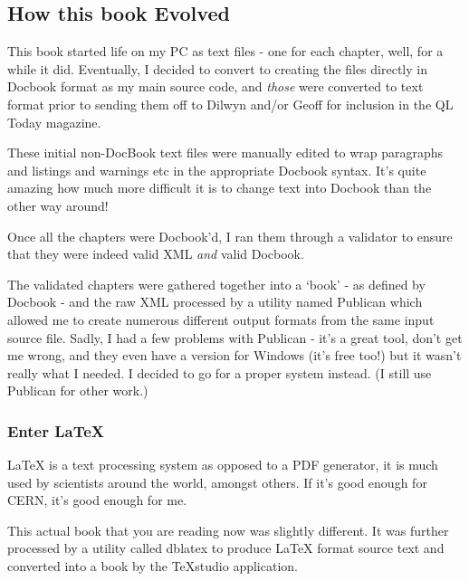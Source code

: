 \begin{appendix}

\chapter{How this book Evolved}
\label{appendix-a-how-it-was-done}%

This book started life on my PC as text files -{} one for each chapter, well, for a while it did. Eventually, I decided to convert to creating the files directly in Docbook format as my main source code, and \emph{those} were converted to text format prior to sending them off to Dilwyn and/or Geoff for inclusion in the QL Today magazine.

These initial non-DocBook text files were manually edited to wrap paragraphs and listings and warnings etc in the appropriate Docbook syntax. It's quite amazing how much more difficult it is to change text into Docbook than the other way around!

Once all the chapters were Docbook'd, I ran them through a validator to ensure that they were indeed valid XML \emph{and} valid Docbook.

The validated chapters were gathered together into a `book' -{} as defined by Docbook -{}
and the raw XML processed by a utility named Publican which allowed me to create numerous different output formats from the same input source file. Sadly, I had a few problems with Publican - it's a great tool, don't get me wrong, and they even have a version for Windows (it's free too!) but it wasn't really what I needed. I decided to go for a proper system instead. (I still use Publican for other work.)

\subsection*{Enter \LaTeX{}}

\LaTeX{}\program{\LaTeX{}} is a text processing system as opposed to a PDF generator, it is much used by scientists around the world, amongst others. If it's good enough for CERN, it's good enough for me.

This actual book that you are reading now was slightly different. It was further processed by a utility called dblatex to produce  \LaTeX{}\program{\LaTeX{}} format source text and converted into a book by the TeXstudio application.


\end{appendix}
